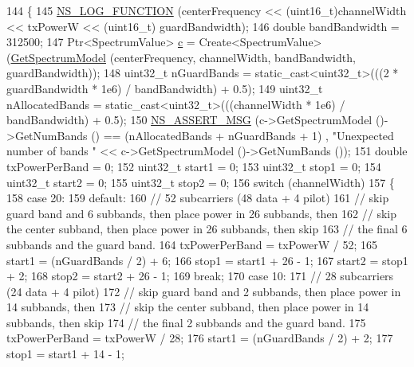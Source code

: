 \begin{DoxyCode}
144 \{
145   \hyperlink{log-macros-disabled_8h_a90b90d5bad1f39cb1b64923ea94c0761}{NS\_LOG\_FUNCTION} (centerFrequency << (uint16\_t)channelWidth << txPowerW << (uint16\_t)
      guardBandwidth);
146   \textcolor{keywordtype}{double} bandBandwidth = 312500;
147   Ptr<SpectrumValue> \hyperlink{lte_2model_2fading-traces_2fading__trace__generator_8m_ae0323a9039add2978bf5b49550572c7c}{c} = Create<SpectrumValue> (\hyperlink{classns3_1_1WifiSpectrumValueHelper_a09b58fb2741ff1a78ae6d952ad08b1bb}{GetSpectrumModel} (centerFrequency, 
      channelWidth, bandBandwidth, guardBandwidth));
148   uint32\_t nGuardBands = \textcolor{keyword}{static\_cast<}uint32\_t\textcolor{keyword}{>}(((2 * guardBandwidth * 1e6) / bandBandwidth) + 0.5);
149   uint32\_t nAllocatedBands = \textcolor{keyword}{static\_cast<}uint32\_t\textcolor{keyword}{>}(((channelWidth * 1e6) / bandBandwidth) + 0.5);
150   \hyperlink{assert_8h_aff5ece9066c74e681e74999856f08539}{NS\_ASSERT\_MSG} (c->GetSpectrumModel ()->GetNumBands () == (nAllocatedBands + nGuardBands + 1)
      , \textcolor{stringliteral}{"Unexpected number of bands "} << c->GetSpectrumModel ()->GetNumBands ());
151   \textcolor{keywordtype}{double} txPowerPerBand = 0;
152   uint32\_t start1 = 0;
153   uint32\_t stop1 = 0;
154   uint32\_t start2 = 0;
155   uint32\_t stop2 = 0;
156   \textcolor{keywordflow}{switch} (channelWidth)
157     \{
158     \textcolor{keywordflow}{case} 20:
159     \textcolor{keywordflow}{default}:
160       \textcolor{comment}{// 52 subcarriers (48 data + 4 pilot)}
161       \textcolor{comment}{// skip guard band and 6 subbands, then place power in 26 subbands, then}
162       \textcolor{comment}{// skip the center subband, then place power in 26 subbands, then skip}
163       \textcolor{comment}{// the final 6 subbands and the guard band.}
164       txPowerPerBand = txPowerW / 52;
165       start1 = (nGuardBands / 2) + 6;
166       stop1 = start1 + 26 - 1;
167       start2 = stop1 + 2;
168       stop2 = start2 + 26 - 1;
169       \textcolor{keywordflow}{break};
170     \textcolor{keywordflow}{case} 10:
171       \textcolor{comment}{// 28 subcarriers (24 data + 4 pilot)}
172       \textcolor{comment}{// skip guard band and 2 subbands, then place power in 14 subbands, then}
173       \textcolor{comment}{// skip the center subband, then place power in 14 subbands, then skip}
174       \textcolor{comment}{// the final 2 subbands and the guard band.}
175       txPowerPerBand = txPowerW / 28;
176       start1 = (nGuardBands / 2) + 2;
177       stop1 = start1 + 14 - 1;

\end{DoxyCode}

